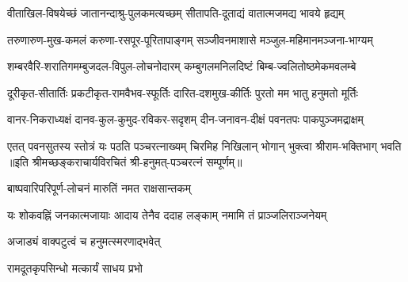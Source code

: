 
\twolineshloka
{वीताखिल-विषयेच्छं जातानन्दाश्रु-पुलकमत्यच्छम्}
{सीतापति-दूताद्यं वातात्मजमद्य भावये हृद्यम्}

\twolineshloka
{तरुणारुण-मुख-कमलं करुणा-रसपूर-पूरितापाङ्गम्}
{सञ्जीवनमाशासे मञ्जुल-महिमानमञ्जना-भाग्यम्}

\twolineshloka
{शम्बरवैरि-शरातिगमम्बुजदल-विपुल-लोचनोदारम्}
{कम्बुगलमनिलदिष्टं बिम्ब-ज्वलितोष्ठमेकमवलम्बे}

\twolineshloka
{दूरीकृत-सीतार्तिः प्रकटीकृत-रामवैभव-स्फूर्तिः}
{दारित-दशमुख-कीर्तिः पुरतो मम भातु हनुमतो मूर्तिः}

\twolineshloka
{वानर-निकराध्यक्षं दानव-कुल-कुमुद-रविकर-सदृशम्}
{दीन-जनावन-दीक्षं पवनतपः पाकपुञ्जमद्राक्षम्}

\twolineshloka
{एतत् पवनसुतस्य स्तोत्रं यः पठति पञ्चरत्नाख्यम्}
{चिरमिह निखिलान् भोगान् भुक्त्वा श्रीराम-भक्तिभाग् भवति}
॥इति श्रीमच्छङ्कराचार्यविरचितं श्री-हनुमत्-पञ्चरत्नं सम्पूर्णम्॥

{बाष्पवारिपरिपूर्ण-लोचनं मारुतिं नमत राक्षसान्तकम्‌}

{यः शोकवह्निं जनकात्मजायाः}
{आदाय तेनैव ददाह लङ्काम्}
{नमामि तं प्राञ्जलिराञ्जनेयम्}

{अजाड्यं वाक्पटुत्वं च हनुमत्स्मरणाद्भवेत्}

{रामदूतकृपसिन्धो मत्कार्यं साधय प्रभो}

